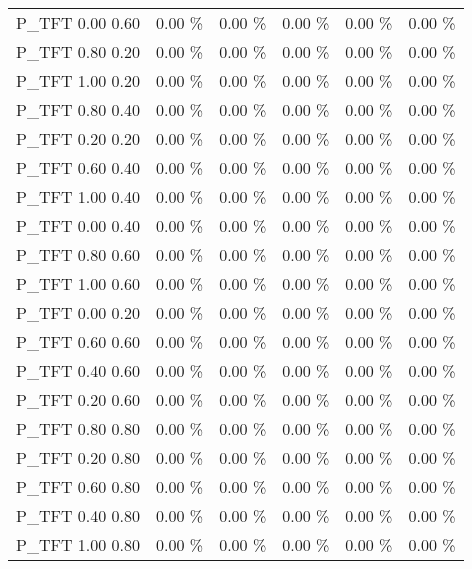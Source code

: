 \begin{tabular}{|l|r|r|r|r|r|}
P\_TFT 0.00 0.60              &    0.00 \%  &    0.00 \%  &    0.00 \%  &    0.00 \%  &    0.00 \% \\
P\_TFT 0.80 0.20              &    0.00 \%  &    0.00 \%  &    0.00 \%  &    0.00 \%  &    0.00 \% \\
P\_TFT 1.00 0.20              &    0.00 \%  &    0.00 \%  &    0.00 \%  &    0.00 \%  &    0.00 \% \\
P\_TFT 0.80 0.40              &    0.00 \%  &    0.00 \%  &    0.00 \%  &    0.00 \%  &    0.00 \% \\
P\_TFT 0.20 0.20              &    0.00 \%  &    0.00 \%  &    0.00 \%  &    0.00 \%  &    0.00 \% \\
P\_TFT 0.60 0.40              &    0.00 \%  &    0.00 \%  &    0.00 \%  &    0.00 \%  &    0.00 \% \\
P\_TFT 1.00 0.40              &    0.00 \%  &    0.00 \%  &    0.00 \%  &    0.00 \%  &    0.00 \% \\
P\_TFT 0.00 0.40              &    0.00 \%  &    0.00 \%  &    0.00 \%  &    0.00 \%  &    0.00 \% \\
P\_TFT 0.80 0.60              &    0.00 \%  &    0.00 \%  &    0.00 \%  &    0.00 \%  &    0.00 \% \\
P\_TFT 1.00 0.60              &    0.00 \%  &    0.00 \%  &    0.00 \%  &    0.00 \%  &    0.00 \% \\
P\_TFT 0.00 0.20              &    0.00 \%  &    0.00 \%  &    0.00 \%  &    0.00 \%  &    0.00 \% \\
P\_TFT 0.60 0.60              &    0.00 \%  &    0.00 \%  &    0.00 \%  &    0.00 \%  &    0.00 \% \\
P\_TFT 0.40 0.60              &    0.00 \%  &    0.00 \%  &    0.00 \%  &    0.00 \%  &    0.00 \% \\
P\_TFT 0.20 0.60              &    0.00 \%  &    0.00 \%  &    0.00 \%  &    0.00 \%  &    0.00 \% \\
P\_TFT 0.80 0.80              &    0.00 \%  &    0.00 \%  &    0.00 \%  &    0.00 \%  &    0.00 \% \\
P\_TFT 0.20 0.80              &    0.00 \%  &    0.00 \%  &    0.00 \%  &    0.00 \%  &    0.00 \% \\
P\_TFT 0.60 0.80              &    0.00 \%  &    0.00 \%  &    0.00 \%  &    0.00 \%  &    0.00 \% \\
P\_TFT 0.40 0.80              &    0.00 \%  &    0.00 \%  &    0.00 \%  &    0.00 \%  &    0.00 \% \\
P\_TFT 1.00 0.80              &    0.00 \%  &    0.00 \%  &    0.00 \%  &    0.00 \%  &    0.00 \% \\
\hline
\end{tabular}
